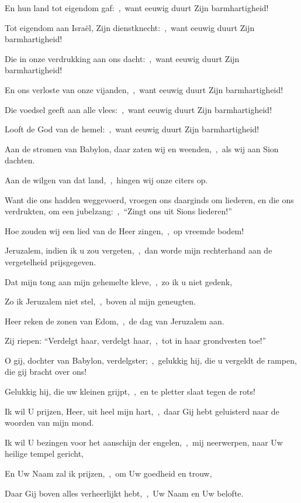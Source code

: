 \documentclass[12pt,twoside,a5paper]{article}
\begin{document}
\begin{halfparskip}
  En hun land tot eigendom gaf:~\sep\ want eeuwig duurt Zijn barmhartigheid!

  Tot eigendom aan Israël, Zijn dienstknecht:~\sep\ want eeuwig duurt Zijn barmhartigheid!

  Die in onze verdrukking aan ons dacht:~\sep\ want eeuwig duurt Zijn barmhartigheid!

  En ons verloste van onze vijanden,~\sep\ want eeuwig duurt Zijn barmhartigheid!

  Die voedsel geeft aan alle vlees:~\sep\ want eeuwig duurt Zijn barmhartigheid!

  Looft de God van de hemel:~\sep\ want eeuwig duurt Zijn barmhartigheid!

   Aan de stromen van Babylon, daar zaten wij en weenden,~\sep\ als wij aan Sion dachten.

  Aan de wilgen van dat land,~\sep\ hingen wij onze citers op.

  Want die ons hadden weggevoerd, vroegen ons daarginds om liederen, en die ons verdrukten, om een jubelzang:~\sep\ ``Zingt ons uit Sions liederen!''

  Hoe zouden wij een lied van de Heer zingen,~\sep\ op vreemde bodem!

  Jeruzalem, indien ik u zou vergeten,~\sep\ dan worde mijn rechterhand aan de vergetelheid prijsgegeven.

  Dat mijn tong aan mijn gehemelte kleve,~\sep\ zo ik u niet gedenk,

  Zo ik Jeruzalem niet stel,~\sep\ boven al mijn geneugten.

  Heer reken de zonen van Edom,~\sep\ de dag van Jeruzalem aan.

  Zij riepen: ``Verdelgt haar, verdelgt haar,~\sep\ tot in haar grondvesten toe!''

  O gij, dochter van Babylon, verdelgster;~\sep\ gelukkig hij, die u vergeldt de rampen, die gij bracht over ons!

  Gelukkig hij, die uw kleinen grijpt,~\sep\ en te pletter slaat tegen de rots!

   Ik wil U prijzen, Heer, uit heel mijn hart,~\sep\ daar Gij hebt geluisterd naar de woorden van mijn mond.

  Ik wil U bezingen voor het aanschijn der engelen,~\sep\ mij neerwerpen, naar Uw heilige tempel gericht,

  En Uw Naam zal ik prijzen,~\sep\ om Uw goedheid en trouw,

  Daar Gij boven alles verheerlijkt hebt,~\sep\ Uw Naam en Uw belofte.


\end{halfparskip}
\end{document}
